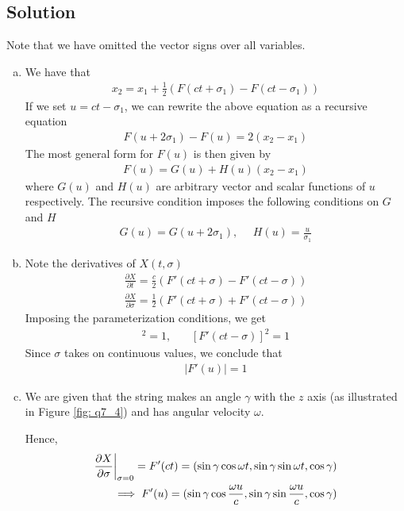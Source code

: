 \documentclass[11pt]{article}
\begin{document}
\subsection*{Solution}
Note that we have omitted the vector signs over all variables. 
\begin{enumerate} [(a)]
    \item We have that 
    \begin{align*}
        {x_2} = {x_1} + \frac{1}{2}\left( {F}(ct + \sigma_1) - {F}(ct - \sigma_1) \right) 
    \end{align*}
    If we set $u = ct - \sigma_1$, we can rewrite the above equation as a recursive equation 
    \begin{align}
        F(u + 2\sigma_1) - F(u) = 2({x_2} - {x_1}) \label{F_periodic}
    \end{align}
    The most general form for $F(u)$ is then given by 
    \begin{align*}
        F(u) = G(u) + H(u) (x_2 - x_1) 
    \end{align*} 
    where $G(u)$ and $H(u)$ are arbitrary vector and scalar functions of $u$ respectively. The recursive condition imposes the following conditions on $G$ and $H$
    \begin{align*}
        G(u) = G(u + 2\sigma_1), ~~~~~~ H(u) = \frac{u}{\sigma_1}
    \end{align*}
    \item Note the derivatives of $X(t, \sigma)$ 
    \begin{align*}
        \frac{\partial X}{\partial t} = \frac{c}{2} \left( F'(ct + \sigma) - F'(ct - \sigma) \right) \\
        \frac{\partial X}{\partial \sigma} = \frac{1}{2} \left( F'(ct + \sigma) + F'(ct - \sigma) \right) 
    \end{align*}
    Imposing the parameterization conditions, we get 
    \begin{align*}
        [F'(ct + \sigma)]^2 = 1, ~~~~~~~~ [F'(ct - \sigma)]^2 = 1
    \end{align*}
    Since $\sigma$ takes on continuous values, we conclude that 
    \begin{align*}
        |F'(u)| = 1
    \end{align*}

    \item We are given that the string makes an angle $\gamma$ with the $z$ axis (as illustrated in Figure \ref{fig: q7_4}) and has angular velocity $\omega$. 
    
    Hence, 
    \begin{align}
        \frac{\partial X}{\partial \sigma} \bigg|_{\sigma = 0} = F'(ct) = (\sin \gamma \cos \omega t, \sin \gamma \sin \omega t, \cos \gamma) \notag \\
        \implies F'(u) = (\sin \gamma \cos \frac{\omega u}{c}, \sin \gamma \sin \frac{\omega u }{c}, \cos \gamma) \label{F'_eq}
    \end{align}


\end{enumerate}
\end{document}
